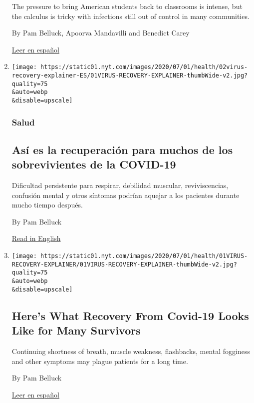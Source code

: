 \begin{enumerate}
  The pressure to bring American students back to classrooms is intense,
  but the calculus is tricky with infections still out of control in
  many communities.

  By Pam Belluck, Apoorva Mandavilli and Benedict Carey

  \href{https://www.nytimes.com/es/2020/07/27/espanol/ciencia-y-tecnologia/regreso-a-clases-coronavirus.html}{Leer
  en español}
\item
  \href{/es/2020/07/02/espanol/ciencia-y-tecnologia/sobrevivientes-coronavirus-recuperacion.html}{}

  \texttt{[image: https://static01.nyt.com/images/2020/07/01/health/02virus-recovery-explainer-ES/01VIRUS-RECOVERY-EXPLAINER-thumbWide-v2.jpg?quality=75\\\&auto=webp\\\&disable=upscale]}

  \hypertarget{salud}{%
  \subsubsection{Salud}\label{salud}}

  \hypertarget{asuxed-es-la-recuperaciuxf3n-para-muchos-de-los-sobrevivientes-de-la-covid-19}{%
  \subsection{Así es la recuperación para muchos de los sobrevivientes
  de la
  COVID-19}\label{asuxed-es-la-recuperaciuxf3n-para-muchos-de-los-sobrevivientes-de-la-covid-19}}

  Dificultad persistente para respirar, debilidad muscular,
  reviviscencias, confusión mental y otros síntomas podrían aquejar a
  los pacientes durante mucho tiempo después.

  By Pam Belluck

  \href{https://www.nytimes.com/2020/07/01/health/coronavirus-recovery-survivors.html}{Read
  in English}
\item
  \href{/2020/07/01/health/coronavirus-recovery-survivors.html}{}

  \texttt{[image: https://static01.nyt.com/images/2020/07/01/health/01VIRUS-RECOVERY-EXPLAINER/01VIRUS-RECOVERY-EXPLAINER-thumbWide-v2.jpg?quality=75\\\&auto=webp\\\&disable=upscale]}

  \hypertarget{heres-what-recovery-from-covid-19-looks-like-for-many-survivors}{%
  \subsection{Here's What Recovery From Covid-19 Looks Like for Many
  Survivors}\label{heres-what-recovery-from-covid-19-looks-like-for-many-survivors}}

  Continuing shortness of breath, muscle weakness, flashbacks, mental
  fogginess and other symptoms may plague patients for a long time.

  By Pam Belluck

  \href{https://www.nytimes.com/es/2020/07/02/espanol/ciencia-y-tecnologia/sobrevivientes-coronavirus-recuperacion.html}{Leer
  en español}
\end{enumerate}


